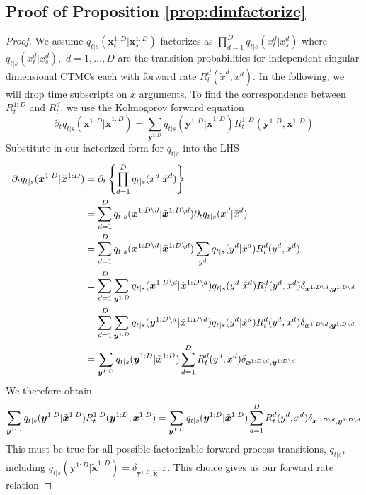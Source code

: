 \documentclass{article}
\begin{document}
\subsection{Proof of Proposition \ref{prop:dimfactorize}}

\begin{proof}
We assume $q_{t|s}(\bm{x}_t^{1:D} | \bm{x}_s^{1:D})$ factorizes as $\prod_{d=1}^D q_{t|s}(x^d_t | x_s^d)$ where $q_{t|s} (x_t^d | x_s^d), \,\, d=1, \dots, D$ are the transition probabilities for independent singular dimensional CTMCs each with forward rate $R_t^d(\tilde{x}^d, x^d)$. In the following, we will drop time subscripts on $x$ arguments. To find the correspondence between $R_t^{1:D}$ and $R_t^d$, we use the Kolmogorov forward equation
\begin{equation}
    \partial_t q_{t|s}(\bm{x}^{1:D} | \tilde{\bm{x}}^{1:D}) = \sum_{\bm{y}^{1:D}} q_{t|s}(\bm{y}^{1:D} | \tilde{\bm{x}}^{1:D}) R_t^{1:D}(\bm{y}^{1:D}, \bm{x}^{1:D})
\end{equation}
Substitute in our factorized form for $q_{t|s}$ into the LHS
\begin{align}
    \partial_t q_{t|s}(\bm{x}^{1:D}|\tilde{\bm{x}}^{1:D}) &= \partial_t \left\{ \prod_{d=1}^D q_{t|s}(x^d | \tilde{x}^d) \right\}\\
    &= \sum_{d=1}^D q_{t|s}(\bm{x}^{1:D \backslash d} | \tilde{\bm{x}}^{1:D \backslash d}) \partial_t q_{t|s}(x^d | \tilde{x}^d)\\
    &= \sum_{d=1}^D q_{t|s}(\bm{x}^{1:D \backslash d} | \tilde{\bm{x}}^{1:D \backslash d}) \sum_{y^d} q_{t|s}(y^d | \tilde{x}^d) R_t^d(y^d, x^d)\\
    &= \sum_{d=1}^D \sum_{\bm{y}^{1:D}} q_{t|s}(\bm{x}^{1:D \backslash d} | \tilde{\bm{x}}^{1:D \backslash d}) q_{t|s}(y^d | \tilde{x}^d) R_t^d(y^d, x^d) \delta_{\bm{x}^{1:D \backslash d}, \bm{y}^{1:D \backslash d}}\\
    &= \sum_{d=1}^D \sum_{\bm{y}^{1:D}} q_{t|s}(\bm{y}^{1:D \backslash d} | \tilde{\bm{x}}^{1:D \backslash d}) q_{t|s}(y^d | \tilde{x}^d) R_t^d(y^d, x^d) \delta_{\bm{x}^{1:D \backslash d}, \bm{y}^{1:D \backslash d}}\\
    &= \sum_{\bm{y}^{1:D}} q_{t|s}(\bm{y}^{1:D}|\tilde{\bm{x}}^{1:D}) \sum_{d=1}^D R_t^d(y^d, x^d) \delta_{\bm{x}^{1:D \backslash d}, \bm{y}^{1:D \backslash d}}
\end{align}
We therefore obtain
\begin{equation}
    \sum_{\bm{y}^{1:D}} q_{t|s}(\bm{y}^{1:D} | \tilde{\bm{x}}^{1:D}) R_t^{1:D}(\bm{y}^{1:D}, \bm{x}^{1:D}) = \sum_{\bm{y}^{1:D}} q_{t|s}(\bm{y}^{1:D}|\tilde{\bm{x}}^{1:D}) \sum_{d=1}^D R_t^d(y^d, x^d) \delta_{\bm{x}^{1:D \backslash d}, \bm{y}^{1:D \backslash d}}
\end{equation}
This must be true for all possible factorizable forward process transitions, $q_{t|s}$, including $q_{t|s}(\bm{y}^{1:D} | \tilde{\bm{x}}^{1:D}) = \delta_{\bm{y}^{1:D}, \tilde{\bm{x}}^{1:D}}$. This choice gives us our forward rate relation

\end{proof}
\end{document}
